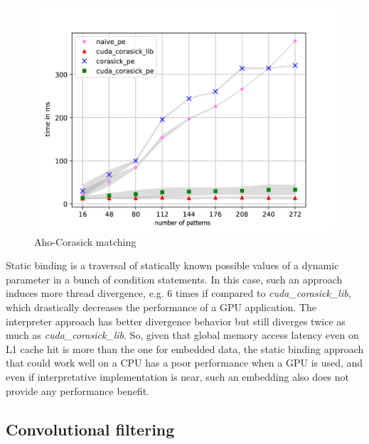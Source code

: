 \begin{figure}[h!]
    \centering
    \includegraphics[width=\linewidth]{figures/PredDefendNaiveSearchorasick(eng).pdf}
    \caption{Aho-Corasick matching}
    \label{fig:my_corasick}
\end{figure}

Static binding is a traversal of statically known possible values of a dynamic 
parameter in a bunch of condition statements. In this case, such an approach 
induces more thread divergence, e.g. 6 times if compared to \emph{cuda\_corasick\_lib}, 
which drastically decreases the performance of a GPU application. 
The interpreter approach has better divergence behavior but still diverges 
twice as much as \emph{cuda\_corasick\_lib}. So, given that global memory access 
latency even on L1 cache hit is more than the one for embedded data, 
the static binding approach that could work well on a CPU has a poor 
performance when a GPU is used, and even if interpretative implementation is 
near, such an embedding also does not provide any performance benefit.

\subsection{Convolutional filtering}

